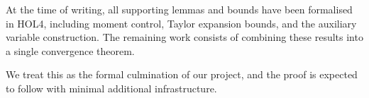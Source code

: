 \medskip

At the time of writing, all supporting lemmas and bounds have been formalised in HOL4, including moment control, Taylor expansion bounds, and the auxiliary variable construction. The remaining work consists of combining these results into a single convergence theorem.

We treat this as the formal culmination of our project, and the proof is expected to follow with minimal additional infrastructure.
